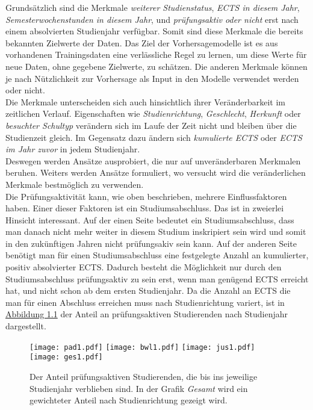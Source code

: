 Grunds\"atzlich sind die Merkmale \textit{\glqq weiterer Studienstatus\grqq{}},
\textit{\glqq ECTS in diesem Jahr\grqq{}}, \textit{\glqq Semesterwochenstunden in diesem Jahr\grqq{}}, und
\textit{\glqq pr\"ufungsaktiv oder nicht\grqq{}} erst nach einem absolvierten Studienjahr verf\"ugbar. Somit sind diese Merkmale
die bereits bekannten Zielwerte der Daten. Das Ziel der Vorhersagemodelle ist es aus vorhandenen Trainingsdaten eine verl\"assliche
Regel zu lernen, um diese Werte f\"ur neue Daten, ohne gegebene Zielwerte, zu
sch\"atzen. Die anderen Merkmale k\"onnen je nach N\"utzlichkeit zur Vorhersage als Input
in den Modelle verwendet werden oder nicht. \\

Die Merkmale unterscheiden sich auch hinsichtlich ihrer Ver\"anderbarkeit im zeitlichen Verlauf. Eigenschaften wie \textit{\glqq Studienrichtung\grqq{}},
\textit{\glqq Geschlecht\grqq{}}, \textit{\glqq Herkunft\grqq{}} oder \textit{\glqq besuchter Schultyp\grqq{}} ver\"andern sich im Laufe der Zeit nicht und bleiben \"uber die Studienzeit gleich.
Im Gegensatz dazu \"andern sich \textit{\glqq kumulierte ECTS\grqq{}} oder \textit{\glqq ECTS im Jahr zuvor\grqq{}} in jedem Studienjahr. \\

Deswegen werden Ans\"atze ausprobiert, die nur auf unver\"anderbaren Merkmalen beruhen. Weiters werden Ans\"atze formuliert, wo versucht wird
die ver\"anderlichen Merkmale bestm\"oglich zu verwenden. \\

Die Pr\"ufungsaktivit\"at kann, wie oben beschrieben, mehrere Einflussfaktoren haben. Einer dieser Faktoren ist ein Studiumsabschluss. Das ist in zweierlei Hinsicht interessant.
Auf der einen Seite bedeutet ein Studiumsabschluss, dass man danach nicht mehr weiter in diesem Studium inskripiert sein wird und somit in den zuk\"unftigen Jahren nicht
pr\"ufungsakiv sein kann. Auf der anderen Seite ben\"otigt man f\"ur einen Studiumsabschluss eine festgelegte Anzahl an kumulierter, positiv absolvierter ECTS. Dadurch besteht die
M\"oglichkeit nur durch den Studiumsabschluss pr\"ufungsaktiv zu sein erst, wenn man gen\"ugend ECTS erreicht hat, und nicht schon ab dem ersten Studienjahr.
Da die Anzahl an ECTS die man f\"ur einen Abschluss erreichen muss nach Studienrichtung variert, ist in \hyperref[fig:abb1]{Abbildung 1.1}
der Anteil an pr\"ufungsaktiven Studierenden nach Studienjahr dargestellt.

\begin{figure}[ht]
  \label{fig:abb1}
  \texttt{[image: pad1.pdf]}
  \texttt{[image: bwl1.pdf]}
  \texttt{[image: jus1.pdf]}
  \texttt{[image: ges1.pdf]}
  \caption[Anteil an pr\"ufungsaktiven Studierenden nach Studienjahr und -richtung]{Der Anteil pr\"ufungsaktiven Studierenden, die bis ins jeweilige
    Studienjahr verblieben sind. In der Grafik \textit{Gesamt} wird ein gewichteter
    Anteil nach Studienrichtung gezeigt wird.}
\end{figure}

